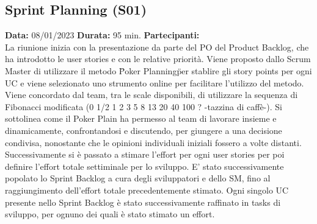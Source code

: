 \begin{landscape}
        \subsection{Sprint Planning (S01)}
        \item \textbf{Data:} 08/01/2023
        \newline \textbf{Durata:} 95 min.
        \newline \textbf{Partecipanti:} \unoP \uno
        \\
        \newline La riunione inizia con la presentazione da parte del PO del Product Backlog, che ha introdotto le user stories e con le relative priorità. Viene proposto dallo Scrum Master di utilizzare il metodo \"Poker Planning\" per stablire gli story points per ogni UC e viene selezionato uno strumento online per facilitare l'utilizzo del metodo. Viene concordato dal team, tra le scale disponibili, di utilizzare la sequenza di Fibonacci modificata (0  1/2  1  2  3  5  8  13  20  40  100  ?  -tazzina di caffè-). Si sottolinea come il Poker Plain ha permesso al team di lavorare insieme e dinamicamente, confrontandosi e discutendo, per giungere a una decisione condivisa, nonostante che le opinioni individuali iniziali fossero a volte distanti. Successivamente si è passato a stimare l'effort per ogni user stories per poi definire l'effort totale settiminale per lo sviluppo. E' stato successivamente popolato lo Sprint Backlog a cura degli sviluppatori e dello SM, fino al raggiungimento dell'effort totale precedentemente stimato. Ogni singolo UC presente nello Sprint Backlog è stato successivamente raffinato in tasks di sviluppo, per ognuno dei quali è stato stimato un effort.

        \newpage

\end{landscape}
